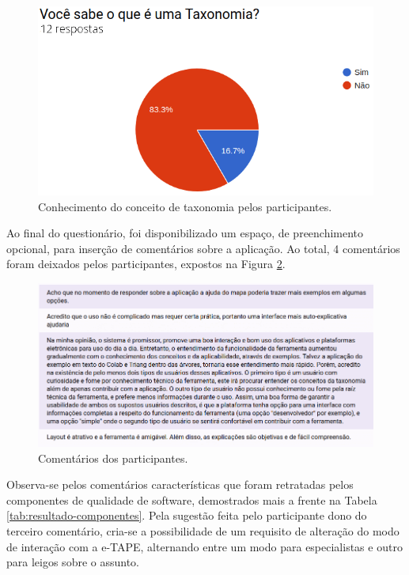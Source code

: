 \begin{figure}[!ht]
    \centering
    \includegraphics[scale=0.4]{./figuras/sabe_taxonomia.png}
    \caption{Conhecimento do conceito de taxonomia pelos participantes.}
    \label{fig:grafico-conhe-taxonomia}
\end{figure}

\par 
Ao final do questionário, foi disponibilizado um espaço, de preenchimento opcional, para  inserção de comentários sobre a aplicação. Ao total, 
4 comentários foram deixados pelos participantes, expostos na Figura \ref{fig:coments}.

\begin{figure}[!ht]
    \centering
    \includegraphics[scale=0.5]{./figuras/coments.png}
    \caption{Comentários dos participantes.}
    \label{fig:coments}
\end{figure}

\par
Observa-se pelos comentários características que foram retratadas pelos componentes de qualidade de software, demostrados mais a frente na Tabela \ref{tab:resultado-componentes}.
Pela sugestão feita pelo participante dono do terceiro comentário, cria-se a possibilidade de um requisito de alteração do modo de interação com a e-TAPE, alternando entre um
modo para especialistas e outro para leigos sobre o assunto.

